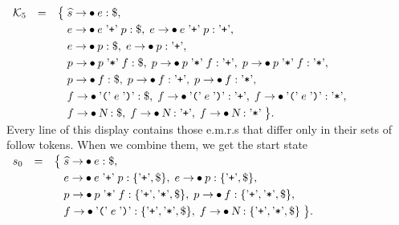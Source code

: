 $\begin{array}[t]{lcl}
   \mathcal{K}_5 & = & \bigl\{\; \widehat{s} \rightarrow \mdot e: \symbol{36}, \\[0.1cm]
                 &   & \hphantom{\bigl\{\;} e \rightarrow \mdot e \aquoted{+} p: \symbol{36},\;
                                            e \rightarrow \mdot e \aquoted{+} p: \saquoted{+}, \\[0.1cm]
                 &   & \hphantom{\bigl\{\;} e \rightarrow \mdot p: \symbol{36},\;
                                            e \rightarrow \mdot p: \saquoted{+}, \\[0.1cm]
                 &   & \hphantom{\bigl\{\;} p \rightarrow \mdot p \aquoted{*} f: \symbol{36},\;
                                            p \rightarrow \mdot p \aquoted{*} f: \saquoted{+},\;
                                            p \rightarrow \mdot p \aquoted{*} f: \saquoted{*}, \\[0.1cm]
                 &   & \hphantom{\bigl\{\;} p \rightarrow \mdot f: \symbol{36},\;
                                            p \rightarrow \mdot f: \saquoted{+},\;
                                            p \rightarrow \mdot f: \saquoted{*}, \\[0.1cm]
                 &   & \hphantom{\bigl\{\;} f \rightarrow \mdot \saquoted{(}\; e \;\saquoted{)}: \symbol{36},\;
                                            f \rightarrow \mdot \saquoted{(}\; e \;\saquoted{)}: \saquoted{+},\;
                                            f \rightarrow \mdot \saquoted{(}\; e \;\saquoted{)}: \saquoted{*}, \\[0.1cm]
                 &   & \hphantom{\bigl\{\;} f \rightarrow \mdot \textsl{N}: \symbol{36},\;
                                            f \rightarrow \mdot \textsl{N}: \saquoted{+},\;
                                            f \rightarrow \mdot \textsl{N}: \saquoted{*} \;\bigr\}.
 \end{array}$
\\[0.2cm]
Every line of this display contains those e.m.r.s that differ only in their sets of follow tokens.  When we
combine them, we get the start state
\\[0.2cm]
\hspace*{1.3cm}
$\begin{array}[t]{lcl}
   s_0 & = & \bigl\{\; \widehat{s} \rightarrow \mdot e: \symbol{36}, \\[0.1cm]
       &   & \hphantom{\bigl\{\;} e \rightarrow \mdot e \aquoted{+} p: \{\saquoted{+}, \symbol{36}\},\;
                                  e \rightarrow \mdot p: \{\saquoted{+}, \symbol{36}\}, \\[0.1cm]
       &   & \hphantom{\bigl\{\;} p \rightarrow \mdot p \aquoted{*} f: \{\saquoted{+}, \saquoted{*}, \symbol{36}\},\;
                                  p \rightarrow \mdot f: \{\saquoted{+}, \saquoted{*}, \symbol{36}\}, \\[0.1cm]
       &   & \hphantom{\bigl\{\;} f \rightarrow \mdot \saquoted{(}\; e \;\saquoted{)}: \{\saquoted{+}, \saquoted{*}, \symbol{36}\},\;
                                  f \rightarrow \mdot \textsl{N}: \{\saquoted{+}, \saquoted{*}, \symbol{36}\} \;\bigr\}.
 \end{array}$
